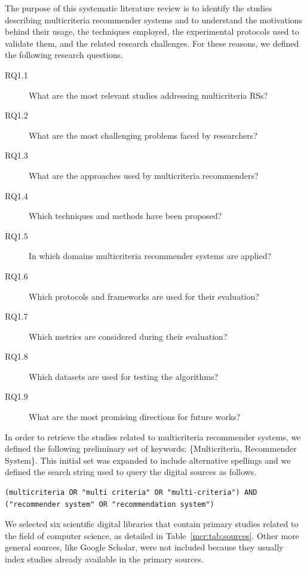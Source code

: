 The purpose of this systematic literature review is to identify the studies describing multicriteria recommender systems and to understand the motivations behind their usage, the techniques employed, the experimental protocols used to validate them, and the related research challenges. For these reasons, we defined the following research questions.

\begin{description}
\item[RQ1.1\label{mcr:itm:rq1}] What are the most relevant studies addressing multicriteria RSs?
\item[RQ1.2\label{mcr:itm:rq2}] What are the most challenging problems faced by researchers?
\item[RQ1.3\label{mcr:itm:rq3}] What are the approaches used by multicriteria recommenders?
\item[RQ1.4\label{mcr:itm:rq4}] Which techniques and methods have been proposed?
\item[RQ1.5\label{mcr:itm:rq5}] In which domains multicriteria recommender systems are applied?
\item[RQ1.6\label{mcr:itm:rq6}] Which protocols and frameworks are used for their evaluation?
\item[RQ1.7\label{mcr:itm:rq7}] Which metrics are considered during their evaluation?
\item[RQ1.8\label{mcr:itm:rq8}] Which datasets are used for testing the algorithms?
\item[RQ1.9\label{mcr:itm:rq9}] What are the most promising directions for future works?
\end{description}

In order to retrieve the studies related to multicriteria recommender systems, we defined the following preliminary set of keywords: \{Multicriteria, Recommender System\}. This initial set was expanded to include alternative spellings and we defined the search string used to query the digital sources as follows.

\begin{lstlisting}
(multicriteria OR "multi criteria" OR "multi-criteria") AND ("recommender system" OR "recommendation system")
\end{lstlisting}

We selected six scientific digital libraries that contain primary studies related to the field of computer science, as detailed in Table~\ref{mcr:tab:sources}. Other more general sources, like Google Scholar, were not included because they usually index studies already available in the primary sources.

